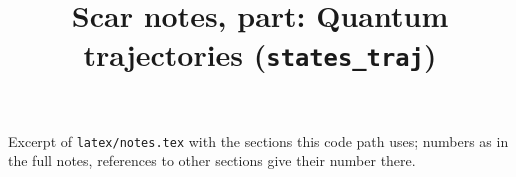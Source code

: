 \documentclass[11pt,a4paper]{article}
\title{Scar notes, part: Quantum trajectories (\texttt{states\_traj})}
\begin{document}
\maketitle
\noindent Excerpt of \texttt{latex/notes.tex} with the sections this code path uses; numbers as in the full notes, references to other sections give their number there.

\tableofcontents

\end{document}
